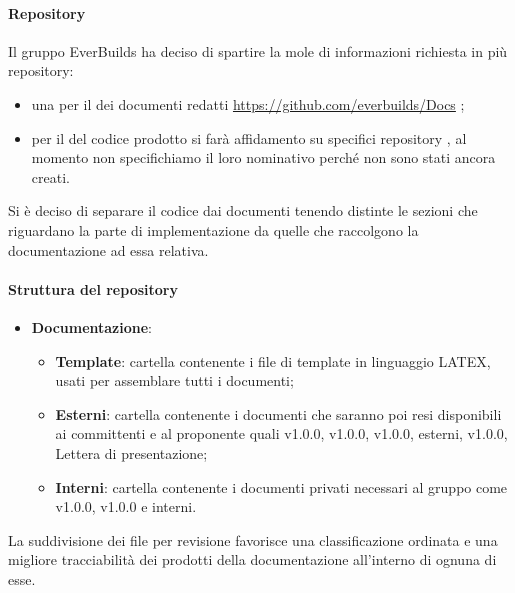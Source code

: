             \paragraph{Repository}
                Il gruppo EverBuilds ha deciso di spartire la mole di informazioni richiesta in più repository:
                \begin{itemize}
                    \item una per il  dei documenti redatti \url{https://github.com/everbuilds/Docs} ;
                    \item per il  del codice prodotto si farà affidamento su specifici repository , al momento non specifichiamo il loro nominativo perché non sono stati ancora creati.
                \end{itemize}
                Si è deciso di separare il codice dai documenti tenendo distinte le sezioni che riguardano la parte di implementazione da quelle che raccolgono la documentazione ad essa relativa.\\
            \paragraph{Struttura del repository}
                \begin{itemize}
                    \item\textbf{Documentazione}:
                        \begin{itemize}
                            \item\textbf{Template}: cartella contenente i file di template in linguaggio LATEX, usati per assemblare tutti i documenti;
                            \item\textbf{Esterni}: cartella contenente i documenti che saranno poi resi disponibili ai committenti e al proponente quali  v1.0.0,  v1.0.0,  v1.0.0,  esterni,  v1.0.0, Lettera di presentazione;
                            \item\textbf{Interni}: cartella contenente i documenti privati necessari al gruppo come  v1.0.0,  v1.0.0 e  interni.
                            
                        \end{itemize}
                \end{itemize}
                La suddivisione dei file per revisione favorisce una classificazione ordinata e una migliore tracciabilità dei prodotti della documentazione all’interno di ognuna di esse.
